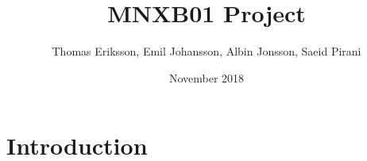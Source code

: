 \documentclass{article}
\title{MNXB01 Project}
\author{Thomas Eriksson, Emil Johansson, Albin Jonsson, Saeid Pirani}
\date{November 2018}
\begin{document}
\maketitle

\section{Introduction}
\end{document}
